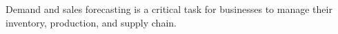 

Demand and sales forecasting is a critical task for businesses to manage their inventory, production, and supply chain.

